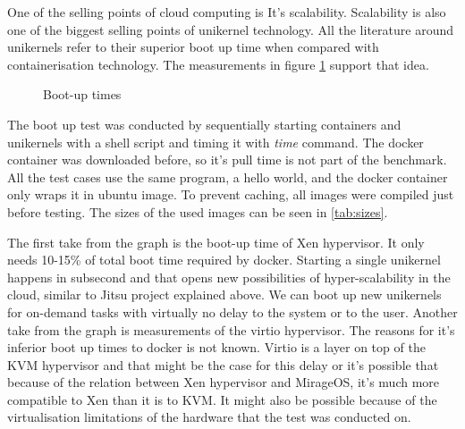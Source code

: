 One of the selling points of cloud computing is It's scalability. Scalability is also one of the biggest selling points of unikernel technology. All the literature around unikernels refer to their superior boot up time when compared with containerisation technology. The measurements in figure \ref{fig:boot-up} support that idea. 
\begin{figure}[htpb]
  \centering
    \caption{Boot-up times}\label{fig:boot-up}
  \end{figure}

The boot up test was conducted by sequentially starting containers and unikernels with a shell script and timing it with \textit{time} command. The docker container was downloaded before, so it's pull time is not part of the benchmark. All the test cases use the same program, a hello world, and the docker container only wraps it in ubuntu image. To prevent caching, all images were compiled just before testing. The sizes of the used images can be seen in \ref{tab:sizes}.

The first take from the graph is the boot-up time of Xen hypervisor. It only needs 10-15\% of total boot time required by docker. Starting a single unikernel happens in subsecond and that opens new possibilities of hyper-scalability in the cloud, similar to Jitsu project explained above. We can boot up new unikernels for on-demand tasks with virtually no delay to the system or to the user. Another take from the graph is measurements of the virtio\cite{virtio} hypervisor. The reasons for it's inferior boot up times to docker is not known. Virtio is a layer on top of the KVM hypervisor and that might be the case for this delay or it's possible that because of the relation between Xen hypervisor and MirageOS, it's much more compatible to Xen than it is to KVM. It might also be possible because of the virtualisation limitations of the hardware that the test was conducted on.

